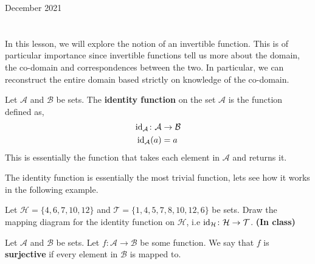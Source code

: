 \documentclass[12pt,oneside]{book} %
\begin{document}
	\renewcommand*{\term}{Term 2} %
	\renewcommand*{\coursecode}{MCR3U} %
	\renewcommand*{\coursename}{Course Name} %
	\renewcommand*{\thelecnum}{3} %
	\renewcommand*{\profname}{Prof Name} %
	\renewcommand*{\colink}{http://www.student.math.uwaterloo.ca/~c2kent} %
	\clearpage
	\pagestyle{classlecture}
\begin{lec}{December 2021}
	\chapter{\chapname\chaplec}
In this lesson, we will explore the notion of an invertible function. This is of particular importance since invertible functions
tell us more about the domain, the co-domain and correspondences between the two. In particular, we can reconstruct 
the entire domain based strictly on knowledge of the co-domain.

\begin{defn}
    Let $\mathcal{A}$ and $\mathcal{B}$ be sets. The \textbf{identity function} on the set $\mathcal{A}$ is the function defined as,
    \begin{align*}
      \operatorname{id}_\mathcal{A} \colon \mathcal{A} &\rightarrow \mathcal{B}\\
      \operatorname{id}_\mathcal{A}(a) &= a
    \end{align*}
    This is essentially the function that takes each element in $\mathcal{A}$ and returns it.
\end{defn}
The identity function is essentially the most trivial function, lets see how it works in the following example.

\begin{ex}
  Let $\mathcal{H} = \{4,6,7,10,12\}$ and $\mathcal{T} = \{1,4,5,7,8,10,12,6\}$ be sets. Draw the mapping diagram for
  the identity function on $\mathcal{H}$, i.e $\operatorname{id}_\mathcal{H} \colon \mathcal{H} \to \mathcal{T}$. \textbf{(In class)}
\end{ex}

\begin{defn}
    Let $\mathcal{A}$ and $\mathcal{B}$ be sets. Let $f \colon \mathcal{A} \to \mathcal{B}$ be some function. We say that $f$ is
    \textbf{surjective} if every element in $\mathcal{B}$ is mapped to.
\end{defn}


\end{lec}
\end{document}
